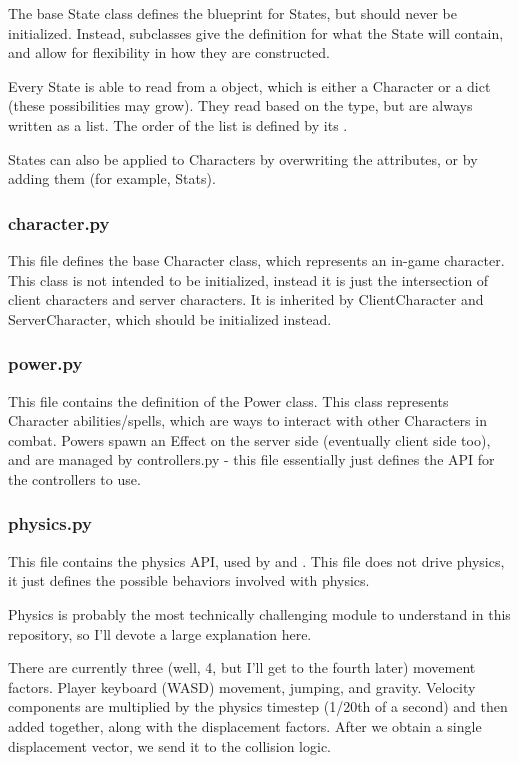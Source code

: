 \documentclass{article}
\begin{document}
The base State class defines the blueprint for States, but should never be initialized.
Instead, subclasses give the definition for what the State will contain, and
allow for flexibility in how they are constructed.

Every State is able to read from a  object, which is either a Character
or a dict (these possibilities may grow). They read based on the type, but are always
written as a list. The order of the list is defined by its .

States can also be applied to Characters by overwriting the attributes, or by adding them
(for example, Stats).
\subsubsection{character.py}
This file defines the base Character class, which represents an in-game character.
This class is not intended to be initialized,
instead it is just the intersection of client characters and server characters. It is
inherited by ClientCharacter and ServerCharacter, which should be initialized instead.

\subsubsection{power.py}
This file contains the definition of the Power class. This class represents Character
abilities/spells, which are ways to interact with other Characters in combat.
Powers spawn an Effect on the server side (eventually client side too), and are
managed by controllers.py - this file essentially just defines the API for the
controllers to use.
\subsubsection{physics.py}
This file contains the physics API, used by  and
. This file does not drive physics, it just defines the possible
behaviors involved with physics.

Physics is probably the most technically challenging module to understand in this
repository, so I'll devote a large explanation here.

There are currently three (well, 4, but I'll get to the fourth later) movement
factors. Player keyboard (WASD) movement, jumping, and gravity. Velocity
components are multiplied by the physics timestep (1/20th of a second) and then
added together, along with the displacement factors. After we obtain a single
displacement vector, we send it to the collision logic.
\end{document}
